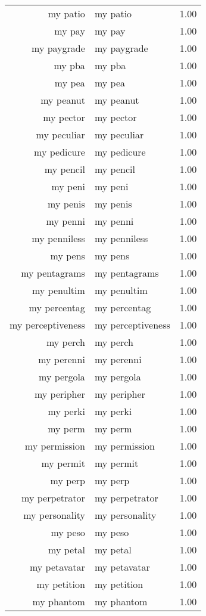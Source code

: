 \begin{table}[ht]
\begin{tabular}{rlr}
  my patio & my patio & 1.00 \\ 
  my pay & my pay & 1.00 \\ 
  my paygrade & my paygrade & 1.00 \\ 
  my pba & my pba & 1.00 \\ 
  my pea & my pea & 1.00 \\ 
  my peanut & my peanut & 1.00 \\ 
  my pector & my pector & 1.00 \\ 
  my peculiar & my peculiar & 1.00 \\ 
  my pedicure & my pedicure & 1.00 \\ 
  my pencil & my pencil & 1.00 \\ 
  my peni & my peni & 1.00 \\ 
  my penis & my penis & 1.00 \\ 
  my penni & my penni & 1.00 \\ 
  my penniless & my penniless & 1.00 \\ 
  my pens & my pens & 1.00 \\ 
  my pentagrams & my pentagrams & 1.00 \\ 
  my penultim & my penultim & 1.00 \\ 
  my percentag & my percentag & 1.00 \\ 
  my perceptiveness & my perceptiveness & 1.00 \\ 
  my perch & my perch & 1.00 \\ 
  my perenni & my perenni & 1.00 \\ 
  my pergola & my pergola & 1.00 \\ 
  my peripher & my peripher & 1.00 \\ 
  my perki & my perki & 1.00 \\ 
  my perm & my perm & 1.00 \\ 
  my permission & my permission & 1.00 \\ 
  my permit & my permit & 1.00 \\ 
  my perp & my perp & 1.00 \\ 
  my perpetrator & my perpetrator & 1.00 \\ 
  my personality & my personality & 1.00 \\ 
  my peso & my peso & 1.00 \\ 
  my petal & my petal & 1.00 \\ 
  my petavatar & my petavatar & 1.00 \\ 
  my petition & my petition & 1.00 \\ 
  my phantom & my phantom & 1.00 \\ 

\end{tabular}
\end{table}
